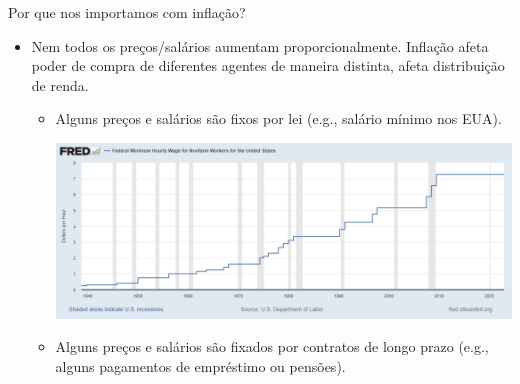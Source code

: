 \documentclass[10pt]{beamer}
\begin{document}
\begin{frame}{Por que nos importamos com inflação?}
    \begin{itemize}
        \item Nem todos os preços/salários aumentam proporcionalmente. Inflação afeta poder de compra de diferentes agentes de maneira distinta, afeta distribuição de renda.\medskip
        \begin{itemize}
            \item Alguns preços e salários são fixos por lei (e.g., salário mínimo nos EUA).        
        \begin{center}
            \begin{minipage}[b]{.8\textwidth}
                \href{https://fred.stlouisfed.org/series/FEDMINNFRWG}{\includegraphics[width=\textwidth]{./figures/minimum wage.png}}            
            \end{minipage}
        \end{center}
    \item Alguns preços e salários são fixados por contratos de longo prazo (e.g., alguns pagamentos de empréstimo ou pensões).
    \end{itemize}
    \end{itemize}
\end{frame}
\end{document}
